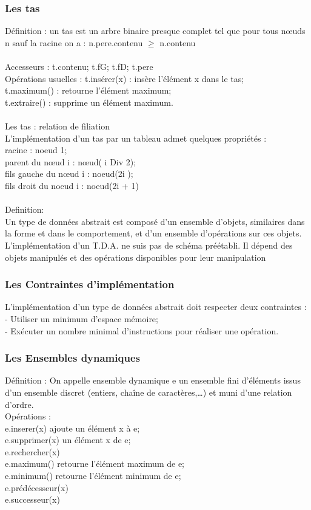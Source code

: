 \documentclass[5pt]{article}
\begin{document}
\begin{scriptsize}
\subsubsection{Les tas }
Définition : un tas est un arbre binaire presque complet tel que pour tous nœuds n sauf la racine on a : n.pere.contenu $\geq$ n.contenu\\
\\
Accesseurs : t.contenu; t.fG; t.fD; t.pere\\
Opérations usuelles : t.insérer(x) : insère l’élément x dans le tas;\\
t.maximum() : retourne l’élément maximum;\\
t.extraire() : supprime un élément maximum.\\
\\
Les tas : relation de filiation\\
L’implémentation d’un tas par un tableau admet quelques propriétés :\\
racine : noeud 1;\\
parent du nœud i : nœud( i Div 2);\\
fils gauche du nœud i : noeud(2i );\\
fils droit du noeud i : noeud(2i + 1)\\
\\
Definition:\\
Un type de données abstrait est composé d’un ensemble d’objets, similaires dans la forme et dans le comportement, et d’un ensemble d’opérations sur ces objets.\\
L’implémentation d’un T.D.A. ne suis pas de  schéma préétabli. Il dépend des objets manipulés  et des opérations disponibles pour leur manipulation
\subsubsection{Les Contraintes d’implémentation }
L’implémentation d’un type de données abstrait doit respecter deux contraintes :\\
- Utiliser un minimum d’espace mémoire;\\
- Exécuter un nombre minimal d’instructions pour réaliser une opération.
\subsubsection{Les Ensembles dynamiques }
Définition : On appelle ensemble dynamique e un ensemble fini d’éléments issus d’un ensemble discret (entiers, chaîne de caractères,…) et muni d’une relation d’ordre.\\
Opérations :\\
e.inserer(x) ajoute un élément x à e;\\
e.supprimer(x) un élément x de e;\\
e.rechercher(x)\\
e.maximum() retourne l’élément maximum de e;\\
e.minimum() retourne l’élément minimum de e;\\
e.prédécesseur(x)\\
e.successeur(x)  

\end{scriptsize}
\end{document}
